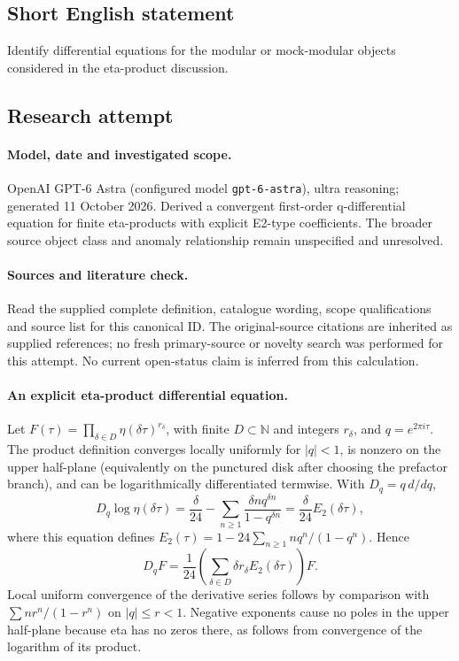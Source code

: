 \documentclass[11pt]{article}
\begin{document}
\subsection{Short English statement}
Identify differential equations for the modular or mock-modular objects considered in the eta-product discussion.
\subsection{Research attempt}
\paragraph{Model, date and investigated scope.}
OpenAI GPT-6 Astra (configured model \texttt{gpt-6-astra}), ultra reasoning; generated 11 October 2026. Derived a convergent first-order q-differential equation for finite eta-products with explicit E2-type coefficients. The broader source object class and anomaly relationship remain unspecified and unresolved.

\paragraph{Sources and literature check.}
Read the supplied complete definition, catalogue wording, scope qualifications and source list for this canonical ID. The original-source citations are inherited as supplied references; no fresh primary-source or novelty search was performed for this attempt. No current open-status claim is inferred from this calculation.

\paragraph{An explicit eta-product differential equation.}Let \(F(\tau)=\prod_{\delta\in D}\eta(\delta\tau)^{r_\delta}\), with finite \(D\subset\mathbb N\) and integers \(r_\delta\), and \(q=e^{2\pi i\tau}\). The product definition converges locally uniformly for \(|q|<1\), is nonzero on the upper half-plane (equivalently on the punctured disk after choosing the prefactor branch), and can be logarithmically differentiated termwise. With \(D_q=q\,d/dq\),
\[D_q\log\eta(\delta\tau)=\frac\delta{24}-\sum_{n\ge1}\frac{\delta n q^{\delta n}}{1-q^{\delta n}}=\frac\delta{24}E_2(\delta\tau),
\]
where this equation defines \(E_2(\tau)=1-24\sum_{n\ge1}nq^n/(1-q^n)\). Hence
\[D_qF=\frac1{24}\left(\sum_{\delta\in D}\delta r_\delta E_2(\delta\tau)\right)F.
\]
Local uniform convergence of the derivative series follows by comparison with \(\sum n r^n/(1-r^n)\) on \(|q|\le r<1\). Negative exponents cause no poles in the upper half-plane because eta has no zeros there, as follows from convergence of the logarithm of its product.
\end{document}
